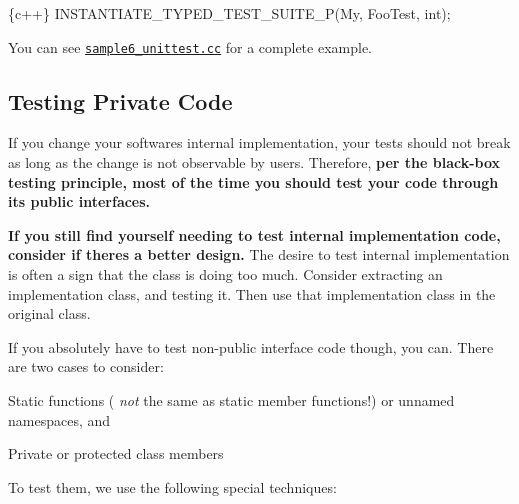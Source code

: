 \begin{DoxyCode}
\{c++\}
INSTANTIATE\_TYPED\_TEST\_SUITE\_P(My, FooTest, int);
\end{DoxyCode}


You can see \href{https://github.com/google/googletest/blob/main/googletest/samples/sample6_unittest.cc}{\tt sample6\+\_\+unittest.\+cc} for a complete example.

\subsection*{Testing Private Code}

If you change your software\textquotesingle{}s internal implementation, your tests should not break as long as the change is not observable by users. Therefore, {\bfseries per the black-\/box testing principle, most of the time you should test your code through its public interfaces.}

{\bfseries If you still find yourself needing to test internal implementation code, consider if there\textquotesingle{}s a better design.} The desire to test internal implementation is often a sign that the class is doing too much. Consider extracting an implementation class, and testing it. Then use that implementation class in the original class.

If you absolutely have to test non-\/public interface code though, you can. There are two cases to consider\+:


\begin{DoxyItemize}
\item Static functions ( {\itshape not} the same as static member functions!) or unnamed namespaces, and
\item Private or protected class members
\end{DoxyItemize}

To test them, we use the following special techniques\+:


